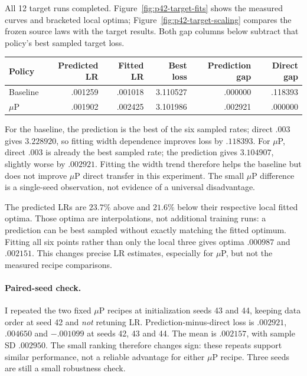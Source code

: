 \documentclass{article}
\begin{document}
All 12 target runs completed. Figure~\ref{fig:p42-target-fits} shows
the measured curves and bracketed local optima;
Figure~\ref{fig:p42-target-scaling} compares the frozen source laws with
the target results. Both gap columns below subtract that policy's best
sampled target loss.
\begin{center}
\small
\setlength{\tabcolsep}{4pt}
\begin{tabular}{lrrrrr}
\toprule
Policy & Predicted LR & Fitted LR & Best loss & Prediction gap & Direct gap \\
\midrule
Baseline & .001259 & .001018 & 3.110527 & .000000 & .118393 \\
$\mu$P & .001902 & .002425 & 3.101986 & .002921 & .000000 \\
\bottomrule
\end{tabular}
\end{center}

For the baseline, the prediction is the best of the six sampled rates;
direct $.003$ gives $3.228920$, so fitting width dependence improves loss
by $.118393$. For $\mu$P, direct $.003$ is already the best sampled rate;
the prediction gives $3.104907$, slightly worse by $.002921$. Fitting the
width trend therefore helps the baseline but does not improve $\mu$P
direct transfer in this experiment. The small $\mu$P difference is a
single-seed observation, not evidence of a universal disadvantage.

The predicted LRs are $23.7\%$ above and $21.6\%$ below their respective
local fitted optima. Those optima are interpolations, not additional
training runs: a prediction can be best sampled without exactly matching
the fitted optimum. Fitting all six points rather than only the local
three gives optima $.000987$ and $.002151$. This changes precise LR
estimates, especially for $\mu$P, but not the measured recipe comparisons.

\paragraph{Paired-seed check.} I repeated the two fixed $\mu$P recipes
at initialization seeds 43 and 44, keeping data order at seed 42 and
\emph{not} retuning LR. Prediction-minus-direct loss is $.002921$,
$.004650$ and $-.001099$ at seeds 42, 43 and 44. The mean is $.002157$,
with sample SD $.002950$. The small ranking therefore changes sign:
these repeats support similar performance, not a reliable advantage for
either $\mu$P recipe. Three seeds are still a small robustness check.
\end{document}
